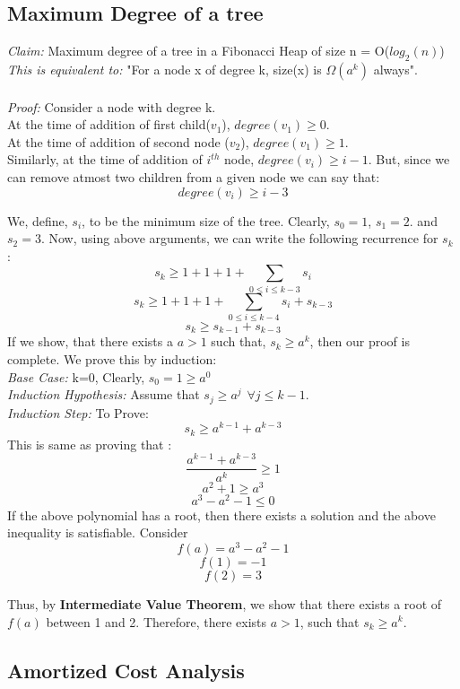 \documentclass{article}
\begin{document}
\subsection{Maximum Degree of a tree}

\emph{Claim: }Maximum degree of a tree in a Fibonacci Heap of size n = O($log_2(n)$) \\
\emph{This is equivalent to: } "For a node x of degree k, size(x) is $\Omega (a^k)$ always". \\ \\
\emph{Proof: } Consider a node with degree k.  \\ At the time of addition of first child($v_1$), $degree(v_1) \geq 0$. \\ At the time of addition of second node ($v_2$), $degree(v_1) \geq 1$. \\ Similarly, at the time of addition of $i^{th}$ node, $degree(v_i) \geq i-1$. But, since we can remove atmost two children from a given node we can say that:
$$degree(v_i) \geq i-3$$

We, define, $s_i$, to be the minimum size of the tree. Clearly, $s_0 = 1$, $s_1 = 2$. and  $s_2 = 3$. Now, using above arguments, we can write the following recurrence for $s_k$ :
$$ s_k \geq 1+1+1+ \sum_{0 \leq i \leq k-3}s_i$$
$$ s_k \geq 1+1+1+ \sum_{0 \leq i \leq k-4}s_i + s_{k-3}$$
$$ s_k \geq s_{k-1} + s_{k-3}$$
If we show, that there exists a $a > 1$ such that, $s_k \geq a^k$, then our proof is complete. We prove this by induction: \\
\emph{Base Case: } k=0, Clearly, $s_0 =1  \geq a^0 $ \\
\emph{Induction Hypothesis: } Assume that $s_j \geq a^j \hspace{5pt}\forall j \leq k-1 $. \\
\emph{Induction Step: }To Prove: $$s_k \geq a^{k-1} + a^{k-3}$$
This is same as proving that :
$$\frac{a^{k-1}+ a^{k-3}}{a^k} \geq 1$$
$$a^2 + 1  \geq  a^3$$
$$a^3 - a^2 -1 \leq 0$$
If the above polynomial has a root, then there exists a solution and the above inequality is satisfiable. Consider $$f(a) = a^3 - a^2 -1$$
$$f(1) = -1 $$
$$f(2) = 3$$

Thus, by \textbf{Intermediate Value Theorem}, we show that there exists a root of $f(a)$ between 1 and 2. Therefore, there exists $a > 1$, such that $s_k \geq a^k$. 

\subsection{Amortized Cost Analysis }
\end{document}
